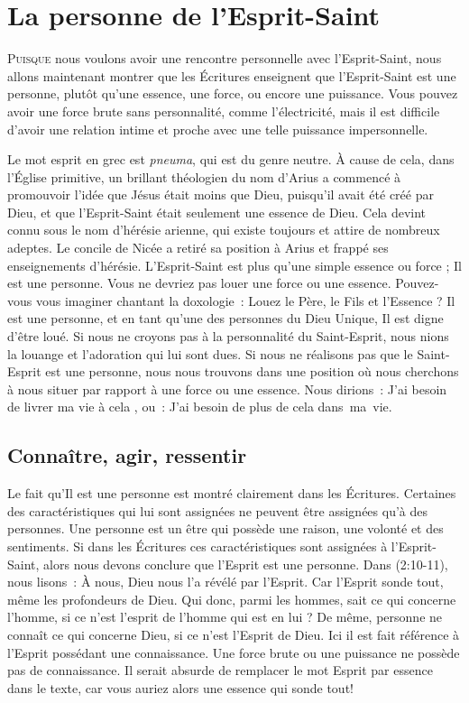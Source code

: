 \chapter{La personne de l'Esprit-Saint}

\lettrine{P}{uisque} nous voulons avoir une rencontre personnelle avec
 l'Esprit-Saint, nous allons maintenant montrer que les Écritures enseignent
 que l'Esprit-Saint est une personne, plutôt qu'une essence, une force, ou
 encore une puissance. Vous pouvez avoir une force brute sans personnalité,
 comme l'électricité, mais il est difficile d'avoir une relation intime et
 proche avec une telle puissance impersonnelle.

Le mot \Og esprit \Fg{} en grec est \emph{pneuma}, qui est du genre neutre.
 À cause de cela, dans l'Église primitive, un brillant théologien du nom
 d'Arius a commencé à promouvoir l'idée que Jésus était moins que Dieu,
 puisqu'il avait été créé par Dieu, et que l'Esprit-Saint était seulement
 une \Og essence \Fg{} de Dieu. Cela devint connu sous le nom d'hérésie
 arienne, qui existe toujours et attire de nombreux adeptes. Le concile de
 Nicée a retiré sa position à Arius et frappé ses enseignements d'hérésie.
 L'Esprit-Saint est plus qu'une simple essence ou force ; Il est
 une personne. Vous ne devriez pas louer une force ou une essence.
 Pouvez-vous vous imaginer chantant la doxologie~:
 \Og Louez le Père, le Fils et l'Essence \Fg{} ?
 Il est une personne, et en tant qu'une des personnes
 du Dieu Unique, Il est digne d'être loué. Si nous ne croyons pas à la
 personnalité du Saint-Esprit, nous nions la louange et l'adoration qui lui
 sont dues. Si nous ne réalisons pas que le Saint-Esprit est une personne,
 nous nous trouvons dans une position où nous cherchons à nous situer par
 rapport à une force ou une essence. Nous dirions~: \Og J'ai besoin de livrer
 ma vie à cela \Fg{}, ou~: \Og J'ai besoin de plus de cela dans~ma~vie.\Fg


\section{Conna\^itre, agir, ressentir}

Le fait qu'Il est une personne est montré clairement dans les Écritures.
 Certaines des caractéristiques qui lui sont assignées ne peuvent être assignées
 qu'à des personnes. Une personne est un être qui possède une raison,
 une volonté et des sentiments.
 Si dans les Écritures ces caractéristiques sont assignées à
 l'Esprit-Saint, alors nous devons conclure que l'Esprit est une personne.
 Dans (2:10-11), nous lisons~: \Og À nous, Dieu nous l'a
 révélé par l'Esprit. Car l'Esprit sonde tout, même les profondeurs de Dieu.
 Qui donc, parmi les hommes, sait ce qui concerne l'homme, si ce n'est
 l'esprit de l'homme qui est en lui ? De même, personne ne connaît ce qui
 concerne Dieu, si ce n'est l'Esprit de Dieu. \Fg{} Ici il est fait référence
 à l'Esprit possédant une connaissance. Une force brute ou une puissance ne
 possède pas de connaissance. Il serait absurde de remplacer le mot
 \Og Esprit \Fg{} par \Og essence \Fg{} dans le texte, car vous auriez alors
 une \Og essence \Fg{} qui sonde tout!

